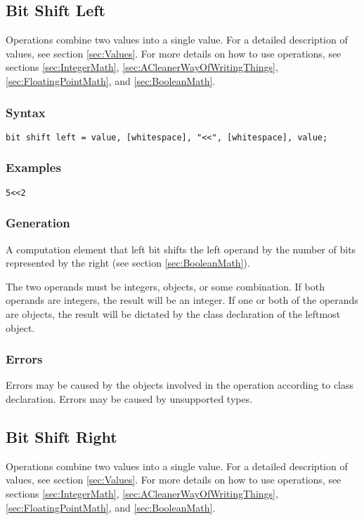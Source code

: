 \documentclass[10pt,a4paper]{article}
\begin{document}
\newpage




\subsection{Bit Shift Left}
Operations combine two values into a single value. For a detailed description of values, see section \ref{sec:Values}. For more details on how to use operations, see sections \ref{sec:IntegerMath}, \ref{sec:ACleanerWayOfWritingThings}, \ref{sec:FloatingPointMath}, and \ref{sec:BooleanMath}.

\subsubsection{Syntax}
\begin{verbatim}
bit shift left = value, [whitespace], "<<", [whitespace], value;
\end{verbatim}

\subsubsection{Examples}
\begin{verbatim}
5<<2
\end{verbatim}

\subsubsection{Generation}
A computation element that left bit shifts the left operand by the number of bits represented by the right (see section \ref{sec:BooleanMath}).

The two operands must be integers, objects, or some combination. If both operands are integers, the result will be an integer. If one or both of the operands are objects, the result will be dictated by the class declaration of the leftmost object.

\subsubsection{Errors}
Errors may be caused by the objects involved in the operation according to class declaration. Errors may be caused by unsupported types.

\newpage




\subsection{Bit Shift Right}
Operations combine two values into a single value. For a detailed description of values, see section \ref{sec:Values}. For more details on how to use operations, see sections \ref{sec:IntegerMath}, \ref{sec:ACleanerWayOfWritingThings}, \ref{sec:FloatingPointMath}, and \ref{sec:BooleanMath}.
\end{document}
